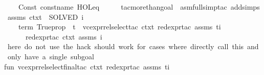 \begin{isabellebody}
\ \ \ \ Const\ {\isacharparenleft}{\kern0pt}{\isacharat}{\kern0pt}{\isacharbraceleft}{\kern0pt}const{\isacharunderscore}{\kern0pt}name\ {\isachardoublequote}{\kern0pt}HOL{\isachardot}{\kern0pt}eq{\isachardoublequote}{\kern0pt}{\isacharbraceright}{\kern0pt}{\isacharcomma}{\kern0pt}{\isacharunderscore}{\kern0pt}{\isacharparenright}{\kern0pt}\ {\isachardollar}{\kern0pt}\ {\isacharunderscore}{\kern0pt}\ {\isachardollar}{\kern0pt}\ {\isacharunderscore}{\kern0pt}\ {\isacharequal}{\kern0pt}{\isachargreater}{\kern0pt}\ {\isacharparenleft}{\kern0pt}tac{\isacharunderscore}{\kern0pt}more{\isacharunderscore}{\kern0pt}than{\isacharunderscore}{\kern0pt}{}{\isacharunderscore}{\kern0pt}goal\ {\isacharparenleft}{\kern0pt}{\isacharparenleft}{\kern0pt}\ asm{\isacharunderscore}{\kern0pt}full{\isacharunderscore}{\kern0pt}simp{\isacharunderscore}{\kern0pt}tac\ {\isacharparenleft}{\kern0pt}add{\isacharunderscore}{\kern0pt}simps\ assms\ ctxt{\isacharparenright}{\kern0pt}\ {\isacharbar}{\kern0pt}{\isachargreater}{\kern0pt}\ SOLVED{\isacharprime}{\kern0pt}{\isacharparenright}{\kern0pt}\ i{\isacharparenright}{\kern0pt}{\isacharparenright}{\kern0pt}\isanewline
\ \ \ {\isacharbar}{\kern0pt}\ {\isacharat}{\kern0pt}{\isacharbraceleft}{\kern0pt}term\ {\isachardoublequote}{\kern0pt}Trueprop{\isachardoublequote}{\kern0pt}{\isacharbraceright}{\kern0pt}\ {\isachardollar}{\kern0pt}\ t{\isacharprime}{\kern0pt}\ {\isacharequal}{\kern0pt}{\isachargreater}{\kern0pt}\ vc{\isacharunderscore}{\kern0pt}expr{\isacharunderscore}{\kern0pt}rel{\isacharunderscore}{\kern0pt}select{\isacharunderscore}{\kern0pt}tac\ ctxt\ red{\isacharunderscore}{\kern0pt}expr{\isacharunderscore}{\kern0pt}tac\ assms\ {\isacharparenleft}{\kern0pt}t{\isacharprime}{\kern0pt}{\isacharcomma}{\kern0pt}i{\isacharparenright}{\kern0pt}\isanewline
\ \ \ {\isacharbar}{\kern0pt}\ {\isacharunderscore}{\kern0pt}\ {\isacharequal}{\kern0pt}{\isachargreater}{\kern0pt}\ red{\isacharunderscore}{\kern0pt}expr{\isacharunderscore}{\kern0pt}tac\ ctxt\ assms\ i\isanewline
\isanewline
{\isacharparenleft}{\kern0pt}{\isacharasterisk}{\kern0pt}\ here\ do\ not\ use\ the\ hack{\isacharcomma}{\kern0pt}\ should\ work\ for\ cases\ where\ directly\ call\ this\ and\ only\ have\ a\ single\ subgoal\ {\isacharasterisk}{\kern0pt}{\isacharparenright}{\kern0pt}\isanewline
fun\ vc{\isacharunderscore}{\kern0pt}expr{\isacharunderscore}{\kern0pt}rel{\isacharunderscore}{\kern0pt}select{\isacharunderscore}{\kern0pt}final{\isacharunderscore}{\kern0pt}tac\ ctxt\ red{\isacharunderscore}{\kern0pt}expr{\isacharunderscore}{\kern0pt}tac\ assms\ {\isacharparenleft}{\kern0pt}t{\isacharcomma}{\kern0pt}i{\isacharparenright}{\kern0pt}\ {\isacharequal}{\kern0pt}\isanewline

\end{isabellebody}
